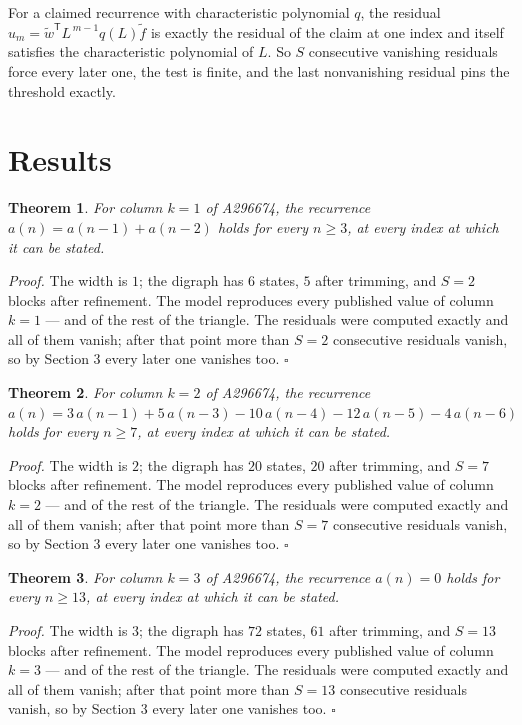 \documentclass[11pt]{article}
\newtheorem{theorem}{Theorem}
\theoremstyle{definition}
\begin{document}
For a claimed recurrence with characteristic polynomial $q$, the residual $u_m = \tilde w^{\mathsf T}L^{\,m-1}q(L)\tilde f$ is exactly the residual of the claim at one index and itself satisfies the characteristic polynomial of $L$. So $S$ consecutive vanishing residuals force every later one, the test is finite, and the last nonvanishing residual pins the threshold exactly.

\section{Results}

\begin{theorem} For column $k = 1$ of A296674, the recurrence $a(n) = a(n-1) + a(n-2)$ holds for every $n \ge 3$, at every index at which it can be stated.\end{theorem}

{\itshape Proof.} The width is $1$; the digraph has $6$ states, $5$ after trimming, and $S = 2$ blocks after refinement. The model reproduces every published value of column $k = 1$ --- and of the rest of the triangle. The residuals were computed exactly and all of them vanish; after that point more than $S = 2$ consecutive residuals vanish, so by Section 3 every later one vanishes too. $\square$

\begin{theorem} For column $k = 2$ of A296674, the recurrence $a(n) = 3\,a(n-1) + 5\,a(n-3) - 10\,a(n-4) - 12\,a(n-5) - 4\,a(n-6)$ holds for every $n \ge 7$, at every index at which it can be stated.\end{theorem}

{\itshape Proof.} The width is $2$; the digraph has $20$ states, $20$ after trimming, and $S = 7$ blocks after refinement. The model reproduces every published value of column $k = 2$ --- and of the rest of the triangle. The residuals were computed exactly and all of them vanish; after that point more than $S = 7$ consecutive residuals vanish, so by Section 3 every later one vanishes too. $\square$

\begin{theorem} For column $k = 3$ of A296674, the recurrence $a(n) = 0$ holds for every $n \ge 13$, at every index at which it can be stated.\end{theorem}

{\itshape Proof.} The width is $3$; the digraph has $72$ states, $61$ after trimming, and $S = 13$ blocks after refinement. The model reproduces every published value of column $k = 3$ --- and of the rest of the triangle. The residuals were computed exactly and all of them vanish; after that point more than $S = 13$ consecutive residuals vanish, so by Section 3 every later one vanishes too. $\square$
\end{document}
